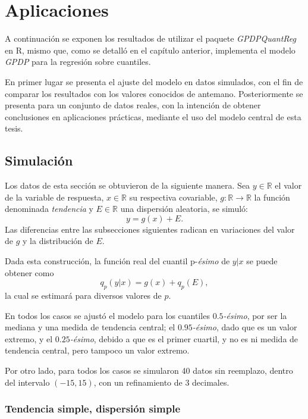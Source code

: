 \chapter[Aplicaciones]{Aplicaciones}

A continuaci\'on se exponen los resultados de utilizar el paquete \textit{GPDPQuantReg} en R, mismo que, como se detalló en el cap\'itulo anterior, implementa el modelo \textit{GPDP} para la regresi\'on sobre cuantiles.

En primer lugar se presenta el ajuste del modelo en datos simulados, con el fin de comparar los resultados con los valores conocidos de antemano. Posteriormente se presenta para un conjunto de datos reales, con la intenci\'on de obtener conclusiones en aplicaciones pr\'acticas, mediante el uso del modelo central de esta tesis.

\section{Simulaci\'on}

Los datos de esta secci\'on se obtuvieron de la siguiente manera. Sea $y \in \mathbb{R}$ el valor de la variable de respuesta, $x \in \mathbb{R}$ su respectiva covariable, $g: \mathbb{R} \rightarrow \mathbb{R}$ la funci\'on denominada \textit{tendencia} y $E \in \mathbb{R}$ una dispersi\'on aleatoria, se simul\'o:
\begin{equation*}
    y = g(x) + E.
\end{equation*}
Las diferencias entre las subsecciones siguientes radican en variaciones del valor de $g$ y la distribuci\'on de $E$.

Dada esta construcci\'on, la funci\'on real del cuantil p-\textit{\'esimo} de $y|x$ se puede obtener como
\begin{equation*}
    q_p(y|x) = g(x) + q_p(E),
\end{equation*}
la cual se estimar\'a para diversos valores de $p$.

En todos los casos se ajust\'o el modelo para los cuantiles $0.5$\textit{-\'esimo}, por ser la mediana y una medida de tendencia central; el $0.95$\textit{-\'esimo}, dado que es un valor extremo, y el $0.25$\textit{-\'esimo}, debido a que es el primer cuartil, y no es ni medida de tendencia central, pero tampoco un valor extremo.

Por otro lado, para todos los casos se simularon 40 datos sin reemplazo, dentro del intervalo $(-15,15)$, con un refinamiento de 3 decimales.

\subsection{Tendencia simple, dispersi\'on simple}

